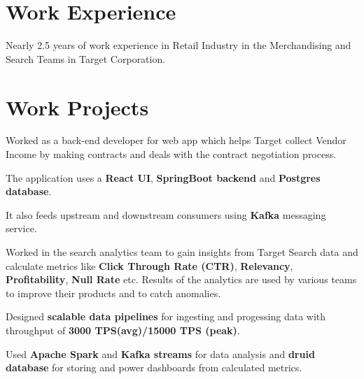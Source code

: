 \documentclass[]{deedy-resume-openfont}
\begin{document}
\begin{minipage}[t]{0.66\textwidth} 


\section{Work Experience}
Nearly 2.5 years of work experience in Retail Industry in the Merchandising and Search Teams in Target Corporation.
\sectionsep

\section{Work Projects}
\vspace{\topsep}
\begin{tightemize}
\item Worked as a back-end developer for web app which helps Target collect Vendor Income by making contracts and deals with the contract negotiation process.
\item The application uses a \textbf{React UI}, \textbf{SpringBoot backend} and \textbf{Postgres database}.
\item It also feeds upstream and downstream consumers using \textbf{Kafka} messaging service.
\end{tightemize}
\sectionsep

\vspace{\topsep} %
\begin{tightemize}
\item Worked in the search analytics team to gain insights from Target Search data and calculate metrics like \textbf{Click Through Rate (CTR)}, \textbf{Relevancy}, \textbf{Profitability}, \textbf{Null Rate} etc. Results of the analytics are used by various teams to improve their products and to catch anomalies.
\item Designed \textbf{scalable data pipelines} for ingesting and progessing data with throughput of \textbf{3000 TPS(avg)/15000 TPS (peak)}.
\item Used \textbf{Apache Spark} and \textbf{Kafka streams} for data analysis and \textbf{druid database} for storing and power dashboards from calculated metrics.
\end{tightemize}
\sectionsep


\end{minipage}
\end{document}
